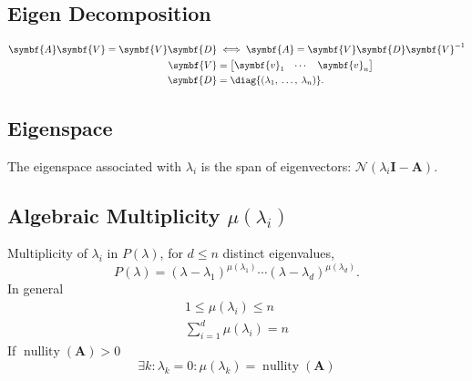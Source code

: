 \documentclass{article}
\DeclareMathOperator*{\nullity}{nullity}
\begin{document}
\begin{multicols*}{3}
    \subsection{Eigen Decomposition}
    \begin{align*}
        \symbf{A} \symbf{V} = \symbf{V} \symbf{D}
                  & \iff
        \symbf{A} = \symbf{V} \symbf{D} \symbf{V}^{-1}                       \\
        \symbf{V} & =
                      \begin{bmatrix}
                          \symbf{v}_1 & \cdots & \symbf{v}_n
                      \end{bmatrix}
        \\
        \symbf{D} & = \diag{\left( \lambda_1,\: \dots,\: \lambda_n \right)}.
    \end{align*}
    \subsection{Eigenspace}
    The eigenspace associated with \(\lambda_i\) is the span of
    eigenvectors: \(\mathcal{N}{\left( \lambda_i \symbf{I} - \symbf{A}
    \right)}\).
    \subsection{Algebraic Multiplicity \texorpdfstring{\(\mu\left( \lambda_i \right)\)}{mu(lambda i)}}
    Multiplicity of \(\lambda_i\) in \(P(\lambda)\),
    for \(d \leq n\) distinct eigenvalues,
    \begin{equation*}
        P\left( \lambda \right) = \left( \lambda - \lambda_1 \right)^{\mu\left( \lambda_1 \right)} \cdots \left( \lambda - \lambda_d \right)^{\mu\left( \lambda_d \right)}.
    \end{equation*}
    In general
    \begin{gather*}
        1 \leq \mu\left( \lambda_i \right) \leq n         \\
        \sum_{i = 1}^d \mu \left( \lambda_i \right) = n
    \end{gather*}
    If \(\nullity{\left( \symbf{A} \right)} > 0\)
    \begin{equation*}
        \exists k : \lambda_k = 0 : \mu\left( \lambda_k \right) = \nullity{\left( \symbf{A} \right)}
    \end{equation*}

\end{multicols*}
\end{document}
